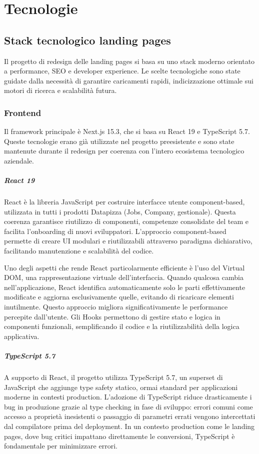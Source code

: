 \chapter{Tecnologie}

\section{Stack tecnologico landing pages}
Il progetto di redesign delle landing pages si basa su uno stack moderno 
orientato a performance, SEO e developer experience. Le scelte tecnologiche 
sono state guidate dalla necessità di garantire caricamenti rapidi, 
indicizzazione ottimale sui motori di ricerca e scalabilità futura.

\subsection{Frontend}

Il framework principale è Next.js 15.3, che si basa su React 19 e TypeScript 
5.7. Queste tecnologie erano già utilizzate nel progetto preesistente e sono 
state mantenute durante il redesign per coerenza con l'intero ecosistema 
tecnologico aziendale.

\paragraph{React 19}
React è la libreria JavaScript per costruire interfacce utente component-based, 
utilizzata in tutti i prodotti Datapizza (Jobs, Company, gestionale). Questa 
coerenza garantisce riutilizzo di componenti, competenze consolidate del team e 
facilita l'onboarding di nuovi sviluppatori. L'approccio component-based permette 
di creare UI modulari e riutilizzabili attraverso paradigma dichiarativo, 
facilitando manutenzione e scalabilità del codice.

Uno degli aspetti che rende React particolarmente efficiente è l'uso del Virtual 
DOM, una rappresentazione virtuale dell'interfaccia. Quando qualcosa cambia 
nell'applicazione, React identifica automaticamente solo le parti effettivamente 
modificate e aggiorna esclusivamente quelle, evitando di ricaricare elementi 
inutilmente. Questo approccio migliora significativamente le performance 
percepite dall'utente. Gli Hooks permettono di gestire stato e logica in 
componenti funzionali, semplificando il codice e la riutilizzabilità della 
logica applicativa.

\paragraph{TypeScript 5.7}
A supporto di React, il progetto utilizza TypeScript 5.7, un superset di 
JavaScript che aggiunge type safety statico, ormai standard per applicazioni 
moderne in contesti production. L'adozione di TypeScript riduce drasticamente i 
bug in produzione grazie al type checking in fase di sviluppo: errori comuni 
come accesso a proprietà inesistenti o passaggio di parametri errati vengono 
intercettati dal compilatore prima del deployment. In un contesto production 
come le landing pages, dove bug critici impattano direttamente le conversioni, 
TypeScript è fondamentale per minimizzare errori.

